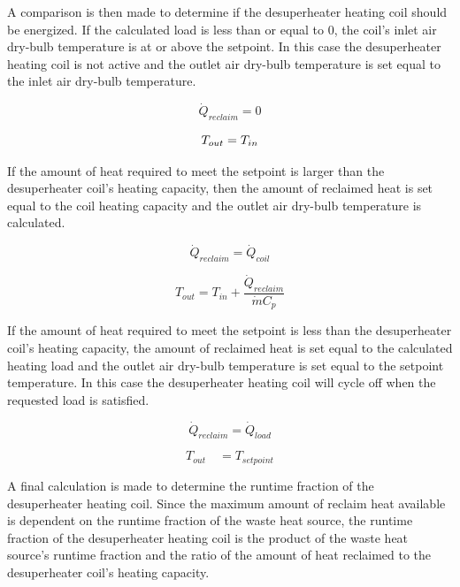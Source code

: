 A comparison is then made to determine if the desuperheater heating coil should be energized. If the calculated load is less than or equal to 0, the coil's inlet air dry-bulb temperature is at or above the setpoint. In this case the desuperheater heating coil is not active and the outlet air dry-bulb temperature is set equal to the inlet air dry-bulb temperature.

\begin{equation}
{\dot Q_{reclaim}} = 0
\end{equation}

\begin{equation}
{T_{out}}{\rm{ }} = {\rm{ }}{T_{in}}
\end{equation}

If the amount of heat required to meet the setpoint is larger than the desuperheater coil's heating capacity, then the amount of reclaimed heat is set equal to the coil heating capacity and the outlet air dry-bulb temperature is calculated.

\begin{equation}
{\dot Q_{reclaim}} = {\dot Q_{coil}}
\end{equation}

\begin{equation}
{T_{out}} = {T_{in}} + \frac{{{{\dot Q}_{reclaim}}}}{{\dot m{C_p}}}
\end{equation}

If the amount of heat required to meet the setpoint is less than the desuperheater coil's heating capacity, the amount of reclaimed heat is set equal to the calculated heating load and the outlet air dry-bulb temperature is set equal to the setpoint temperature. In this case the desuperheater heating coil will cycle off when the requested load is satisfied.

\begin{equation}
{\dot Q_{reclaim}} = {\dot Q_{load}}
\end{equation}

\begin{equation}
{T_{out}}\quad = {T_{setpoint}}
\end{equation}

A final calculation is made to determine the runtime fraction of the desuperheater heating coil. Since the maximum amount of reclaim heat available is dependent on the runtime fraction of the waste heat source, the runtime fraction of the desuperheater heating coil is the product of the waste heat source's runtime fraction and the ratio of the amount of heat reclaimed to the desuperheater coil's heating capacity.

